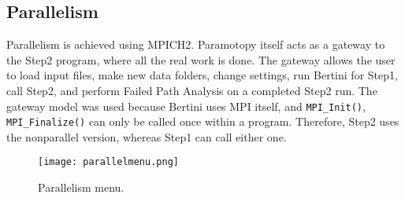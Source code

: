 \clearpage






\subsection{Parallelism}
Parallelism is achieved using MPICH2.  Paramotopy itself acts as a gateway to the Step2 program, where all the real work is done.  The gateway allows the user to load input files, make new data folders, change settings, run Bertini for Step1, call Step2, and perform Failed Path Analysis on a completed Step2 run.  The gateway model was used because Bertini uses MPI itself, and \texttt{MPI\_Init()}, \texttt{MPI\_Finalize()} can only be called once within a program.  Therefore, Step2 uses the nonparallel version, whereas Step1 can call either one.

\begin{figure}[h]
\begin{center}
\texttt{[image: parallelmenu.png]}
\caption[Parallelism Menu]{Parallelism menu.}
\label{screen:parallelmenu}
\end{center}
\end{figure}

